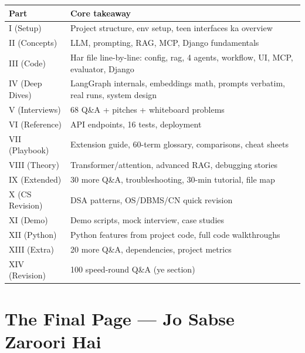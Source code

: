 \begin{longtable}{p{4.6cm} p{9.6cm}}
\toprule
\textbf{Part} & \textbf{Core takeaway} \\
\midrule
I (Setup) & Project structure, env setup, teen interfaces ka overview \\
II (Concepts) & LLM, prompting, RAG, MCP, Django fundamentals \\
III (Code) & Har file line-by-line: config, rag, 4 agents, workflow, UI, MCP, evaluator, Django \\
IV (Deep Dives) & LangGraph internals, embeddings math, prompts verbatim, real runs, system design \\
V (Interviews) & 68 Q\&A + pitches + whiteboard problems \\
VI (Reference) & API endpoints, 16 tests, deployment \\
VII (Playbook) & Extension guide, 60-term glossary, comparisons, cheat sheets \\
VIII (Theory) & Transformer/attention, advanced RAG, debugging stories \\
IX (Extended) & 30 more Q\&A, troubleshooting, 30-min tutorial, file map \\
X (CS Revision) & DSA patterns, OS/DBMS/CN quick revision \\
XI (Demo) & Demo scripts, mock interview, case studies \\
XII (Python) & Python features from project code, full code walkthroughs \\
XIII (Extra) & 20 more Q\&A, dependencies, project metrics \\
XIV (Revision) & 100 speed-round Q\&A (ye section) \\
\bottomrule
\end{longtable}

\section{The Final Page --- Jo Sabse Zaroori Hai}

